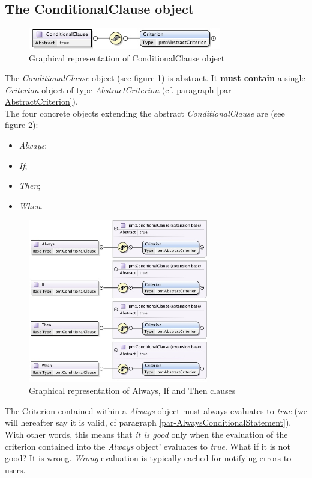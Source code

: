\documentclass[a4paper,11pt] {ivoa}
\begin{document}
\subsection{The ConditionalClause object}\label{par-ConditionalClause}
\begin{figure}[htbp]
\begin{center}
\includegraphics[width=0.75\textwidth]{pictures/ConditionalClause.jpg} 
\caption{Graphical representation of ConditionalClause object}
\label{Pic-ConditionalClause}
\end{center}
\end{figure}
The {\it ConditionalClause} object (see figure \ref{Pic-ConditionalClause}) is abstract. It {\bf
must contain} a single {\it Criterion} object of type {\it AbstractCriterion} (cf. paragraph
\ref{par-AbstractCriterion}).\\
The four concrete objects extending the abstract {\it ConditionalClause} are (see figure
\ref{Pic-ConcreteClause}):
\begin{itemize}
\item {\it Always};
\item {\it If};
\item {\it Then};
\item {\it When}.
\end{itemize}
\begin{figure}[htbp]
\begin{center}
\includegraphics[width=0.7\textwidth]{pictures/ConcreteClauses.jpg} 
\caption{Graphical representation of Always, If and Then clauses}
\label{Pic-ConcreteClause}
\end{center}
\end{figure}
The Criterion contained within a {\it Always} object must always evaluates to {\it true} (we will hereafter say it is valid, cf paragraph
\ref{par-AlwaysConditionalStatement}). With other words, this means that {\it it is good} only when the evaluation of the criterion contained into the {\it Always} object' evaluates to {\it true}. What if it is not good? It is wrong. {\it Wrong} evaluation is typically cached for notifying errors to users.\\
\end{document}
